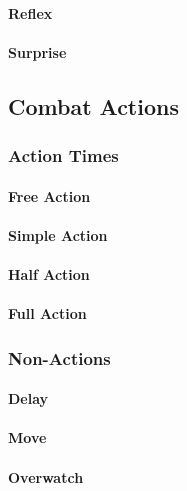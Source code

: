 \paragraph{Reflex}

\paragraph{Surprise}

\subsection{Combat Actions}

\subsubsection{Action Times}

\paragraph{Free Action}

\paragraph{Simple Action}

\paragraph{Half Action}

\paragraph{Full Action}

\subsubsection{Non-Actions}

\paragraph{Delay}

\paragraph{Move}

\paragraph{Overwatch}

